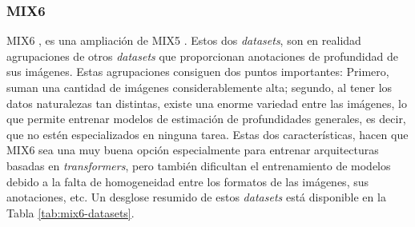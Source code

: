 \subsubsection{MIX6}
MIX6 \cite{visiontransformersDPT}, es una ampliación de MIX5 \cite{midas-intel}. Estos dos \textit{datasets}, son en realidad agrupaciones de otros \textit{datasets} que proporcionan anotaciones de profundidad de sus imágenes. Estas agrupaciones consiguen dos puntos importantes: Primero, suman una cantidad de imágenes considerablemente alta; segundo, al tener los datos naturalezas tan distintas, existe una enorme variedad entre las imágenes, lo que permite entrenar modelos de estimación de profundidades generales, es decir, que no estén especializados en ninguna tarea. Estas dos características, hacen que MIX6 sea una muy buena opción especialmente para entrenar arquitecturas basadas en \textit{transformers}, pero también dificultan el entrenamiento de modelos debido a la falta de homogeneidad entre los formatos de las imágenes, sus anotaciones, etc. Un desglose resumido de estos \textit{datasets} está disponible en la Tabla \ref{tab:mix6-datasets}.

